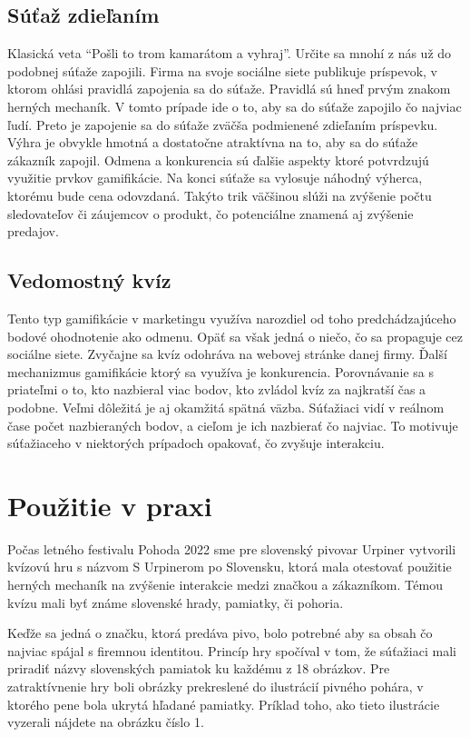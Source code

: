 \documentclass[10pt,twoside,slovak,a4paper]{article}
\begin{document}
\subsection{Súťaž zdieľaním}
Klasická veta “Pošli to trom kamarátom a vyhraj”. Určite sa mnohí z nás už do podobnej súťaže zapojili. Firma na svoje sociálne siete publikuje príspevok, v ktorom ohlási pravidlá zapojenia sa do súťaže. Pravidlá sú hneď prvým znakom herných mechaník. V tomto prípade ide o to, aby sa do súťaže zapojilo čo najviac ľudí. Preto je zapojenie sa do súťaže zväčša podmienené zdieľaním príspevku. Výhra je obvykle hmotná a dostatočne atraktívna na to, aby sa do súťaže zákazník zapojil. Odmena a konkurencia sú ďalšie aspekty ktoré potvrdzujú využitie prvkov gamifikácie. Na konci súťaže sa vylosuje náhodný výherca, ktorému bude cena odovzdaná. Takýto trik väčšinou slúži na zvýšenie počtu sledovateľov či záujemcov o produkt, čo potenciálne znamená aj zvýšenie predajov.

\subsection{Vedomostný kvíz}
Tento typ gamifikácie v marketingu využíva narozdiel od toho predchádzajúceho bodové ohodnotenie ako odmenu. Opäť sa však jedná o niečo, čo sa propaguje cez sociálne siete. Zvyčajne sa kvíz odohráva na webovej stránke danej firmy. Ďalší mechanizmus gamifikácie ktorý sa využíva je konkurencia. Porovnávanie sa s priateľmi o to, kto nazbieral viac bodov, kto zvládol kvíz za najkratší čas a podobne. Veľmi dôležitá je aj okamžitá spätná väzba. Súťažiaci vidí v reálnom čase počet nazbieraných bodov, a cieľom je ich nazbierať čo najviac. To motivuje súťažiaceho v niektorých prípadoch opakovať, čo zvyšuje interakciu.


\section{Použitie v praxi}
Počas letného festivalu Pohoda 2022 sme pre slovenský pivovar Urpiner vytvorili kvízovú hru s názvom S Urpinerom po Slovensku, ktorá mala otestovať použitie herných mechaník na zvýšenie interakcie medzi značkou a zákazníkom. Témou kvízu mali byť známe slovenské hrady, pamiatky, či pohoria.

Keďže sa jedná o značku, ktorá predáva pivo, bolo potrebné aby sa obsah čo najviac spájal s firemnou identitou. Princíp hry spočíval v tom, že súťažiaci mali priradiť názvy slovenských pamiatok ku každému z 18 obrázkov. Pre zatraktívnenie hry boli obrázky prekreslené do ilustrácií pivného pohára, v ktorého pene bola ukrytá hľadané pamiatky. Príklad toho, ako tieto ilustrácie vyzerali nájdete na obrázku číslo 1.
\end{document}
